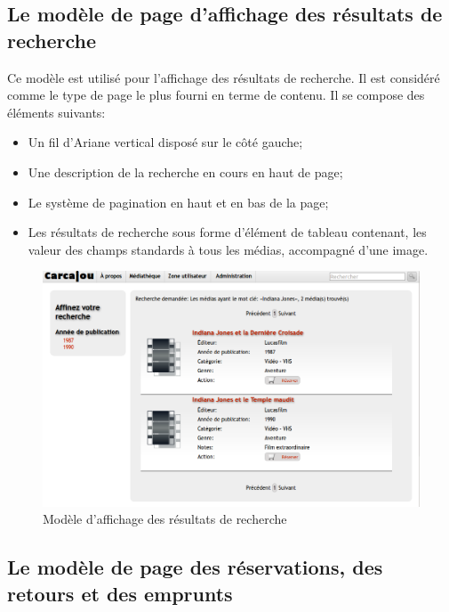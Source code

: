 \documentclass[letter, 11pt]{report}
\begin{document}
\subsection{Le modèle de page d'affichage des résultats de recherche}

Ce modèle est utilisé pour l'affichage des résultats de recherche. Il est considéré comme le type de page le plus fourni en terme de contenu. Il se compose des éléments suivants:

\begin{itemize}
	\item Un fil d'Ariane vertical disposé sur le côté gauche;
	\item Une description de la recherche en cours en haut de page;
	\item Le système de pagination en haut et en bas de la page;
	\item Les résultats de recherche sous forme d'élément de tableau contenant, les valeur des champs standards à tous les médias, accompagné d'une image.
\end{itemize}

\begin{figure}[htbp]
	\begin{center}
		\includegraphics[scale=0.4]{captures_ecran/modele_resultats_recherche.png}
	\end{center}
	\caption{Modèle d'affichage des résultats de recherche}
\end{figure}

\subsection{Le modèle de page des réservations, des retours et des emprunts}
\end{document}
